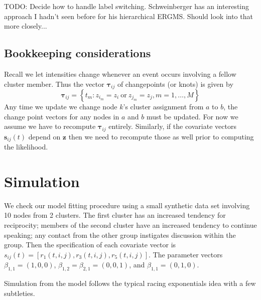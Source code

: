 \documentclass[11pt]{article}
\begin{document}
TODO: Decide how to handle label switching.  Schweinberger has an interesting approach I hadn't seen before for his hierarchical ERGMS.  Should look into that more closely...

\subsection*{Bookkeeping considerations}

Recall we let intensities change whenever an event occurs involving a fellow cluster member.  Thus the vector $\boldsymbol{\tau}_{ij}$ of changepoints (or knots) is given by
$$\boldsymbol{\tau}_{ij} = \left\{ t_m: z_{i_m} = z_i \ \mbox{or} \ z_{j_m} = z_j, m=1,\ldots,M\right\}$$
Any time we update we change node $k$'s cluster assignment from $a$ to $b$, the change point vectors for any nodes in $a$ and $b$ must be updated.  For now we assume we have to recompute  $\boldsymbol{\tau}_{ij}$  entirely.  Similarly, if the covariate vectors $\mathbf{s}_{ij}(t)$ depend on $\mathbf{z}$ then we need to recompute those as well prior to computing the likelihood.%

\section{Simulation}

We check our model fitting procedure using a small synthetic data set involving 10 nodes from 2 clusters.  The first cluster has an increased tendency for reciprocity; members of the second cluster have an increased tendency to continue speaking; any contact from the other group instigates discussion within the group.  Then the specification of each covariate vector is $s_{ij}(t) = [r_1(t,i,j), r_3(t,i,j), r_5(t,i,j)]$.  The parameter vectors $\beta_{1,1} = (1,0,0)$,  $\beta_{1,2} = \beta_{2,1} = (0,0,1)$, and $\beta_{1,1} = (0,1,0)$.

Simulation from the model follows the typical racing exponentials idea with a few subtleties.
\end{document}
